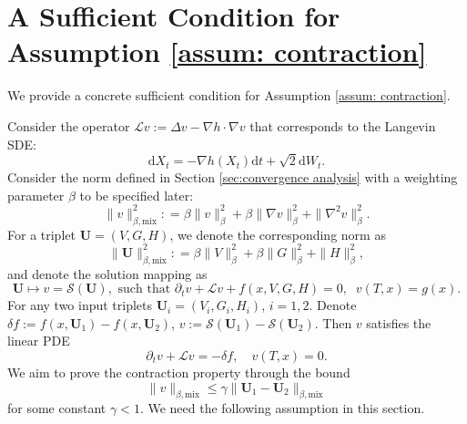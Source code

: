 \documentclass[twoside,11pt]{article}
\newcommand{\dd}{\mathrm{d}}
\newcommand{\1}{\mathbf{1}}
\newcommand{\cL}{\mathcal{L}}
\numberwithin{equation}{section}
\begin{document}

\newpage

\appendix
\section{A Sufficient Condition for Assumption \ref{assum: contraction}}\label{appendix: sufficient condition for contraction}

We provide a concrete sufficient condition for Assumption \ref{assum: contraction}.

Consider the operator $ \cL v :=  \Delta v - \nabla h \cdot\nabla v$ that corresponds to the Langevin SDE:
\begin{equation}
    \dd X_t = -\nabla h(X_t) \dd t + \sqrt{2}\dd W_t.
\end{equation}
Consider the norm defined in Section \ref{sec:convergence analysis} with a weighting parameter $\beta$ to be specified later:
\begin{equation}
    \|v\|^2_{\beta,\textrm{mix}}: = \beta \|v\|_{\beta}^2 + \beta\|\nabla v\|_{\beta}^2 + \|\nabla^2 v\|_{\beta}^2.
\end{equation}
For a triplet $\mathbf U=(V,G,H)$, we denote the corresponding norm as
\begin{equation}
    \|\mathbf U\|^2_{\beta,\textrm{mix}}: = \beta \|V\|_{\beta}^2 + \beta\|G\|_{\beta}^2 + \|H\|_{\beta}^2,
\end{equation}
and denote the solution mapping as
\[\mathbf U \mapsto v = \mathcal S(\mathbf U),\text{ such that } \partial_t v + \cL v +f(x,V,G, H) = 0,\;\;v(T,x)=g(x) .  \]
For any two input triplets $\mathbf U_i=(V_i,G_i,H_i)$, $i=1,2$. Denote $ \delta f := f(x,\mathbf{U}_1) - f(x,\mathbf{U}_2)$, $ v := \mathcal{S}(\mathbf{U}_1) - \mathcal{S}(\mathbf{U}_2)$. Then $v$ satisfies the linear PDE
\begin{equation}\label{eq: linear pde langevin}
    \partial_t v + \cL v = -\delta f, \quad v(T,x) = 0.
\end{equation}
We aim to prove the contraction property through the bound
\begin{equation}
    \|v\|_{\beta,\textrm{mix}} \le \gamma\|\mathbf U_1-\mathbf U_2\|_{\beta,\textrm{mix}}
\end{equation}
for some constant $\gamma<1$. 
We need the following assumption in this section.
\end{document}
